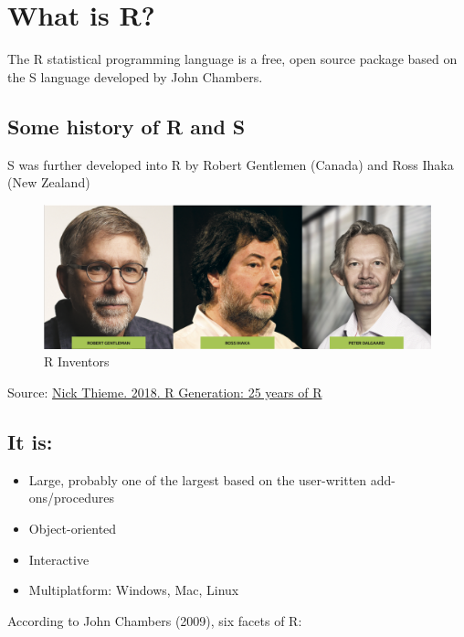 \documentclass[]{book}
\providecommand{\tightlist}{%
  \setlength{\itemsep}{0pt}\setlength{\parskip}{0pt}}
\begin{document}
\hypertarget{what-is-r}{%
\section{What is R?}\label{what-is-r}}

The R statistical programming language is a free, open source package based on the S language developed by John Chambers.

\hypertarget{some-history-of-r-and-s}{%
\subsection{Some history of R and S}\label{some-history-of-r-and-s}}

S was further developed into R by Robert Gentlemen (Canada) and Ross Ihaka (New Zealand)

\begin{figure}
\includegraphics[width=1\linewidth]{Rinventors} \caption{R Inventors}\label{fig:Rinventors}
\end{figure}

Source: \href{https://rss.onlinelibrary.wiley.com/doi/10.1111/j.1740-9713.2018.01169.x}{Nick Thieme. 2018. R Generation: 25 years of R}

\hypertarget{it-is}{%
\subsection{It is:}\label{it-is}}

\begin{itemize}
\tightlist
\item
  Large, probably one of the largest based on the user-written add-ons/procedures
\item
  Object-oriented
\item
  Interactive
\item
  Multiplatform: Windows, Mac, Linux
\end{itemize}

According to John Chambers (2009), six facets of R:
\end{document}
